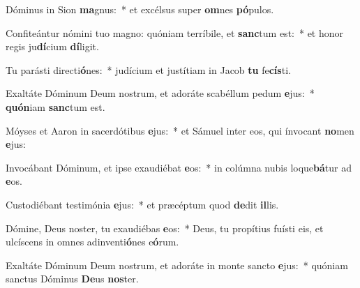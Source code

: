 \item Dóminus in Sion \textbf{ma}gnus:~* et excélsus super \textbf{om}nes \textbf{pó}pulos.
\item Confiteántur nómini tuo magno: quóniam terríbile, et \textbf{sanc}tum est:~* et honor regis ju\textbf{dí}cium \textbf{dí}ligit.
\item Tu parásti directi\textbf{ó}nes:~* judícium et justítiam in Jacob \textbf{tu} fe\textbf{cís}ti.
\item Exaltáte Dóminum Deum nostrum, et adoráte scabéllum pedum \textbf{e}jus:~* \textbf{quón}iam \textbf{sanc}tum est.
\item Móyses et Aaron in sacerdótibus \textbf{e}jus:~* et Sámuel inter eos, qui ínvocant \textbf{no}men \textbf{e}jus:
\item Invocábant Dóminum, et ipse exaudiébat \textbf{e}os:~* in colúmna nubis loque\textbf{bá}tur ad \textbf{e}os.
\item Custodiébant testimónia \textbf{e}jus:~* et præcéptum quod \textbf{de}dit \textbf{il}lis.
\item Dómine, Deus noster, tu exaudiébas \textbf{e}os:~* Deus, tu propítius fuísti eis, et ulcíscens in omnes adinventi\textbf{ó}nes e\textbf{ó}rum.
\item Exaltáte Dóminum Deum nostrum, et adoráte in monte sancto \textbf{e}jus:~* quóniam sanctus Dóminus \textbf{De}us \textbf{nos}ter.
